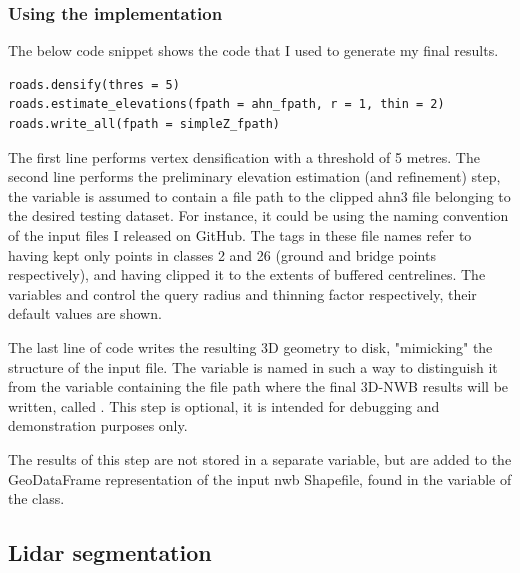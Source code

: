 \subsubsection{Using the implementation}

The below code snippet shows the code that I used to generate my final results.

\begin{verbatim}
roads.densify(thres = 5)
roads.estimate_elevations(fpath = ahn_fpath, r = 1, thin = 2)
roads.write_all(fpath = simpleZ_fpath)
\end{verbatim}

The first line performs vertex densification with a threshold of 5 metres. The second line performs the preliminary elevation estimation (and refinement) step, the variable  is assumed to contain a file path to the clipped \ac{ahn3} file belonging to the desired testing dataset. For instance, it could be  using the naming convention of the input files I released on GitHub. The tags  in these file names refer to having kept only points in classes 2 and 26 (ground and bridge points respectively), and having clipped it to the extents of buffered centrelines. The variables  and  control the query radius and thinning factor respectively, their default values are shown.

The last line of code writes the resulting 3D geometry to disk, "mimicking" the structure of the input file. The variable is named in such a way to distinguish it from the variable containing the file path where the final 3D-NWB results will be written, called . This step is optional, it is intended for debugging and demonstration purposes only.

The results of this step are not stored in a separate variable, but are added to the GeoDataFrame representation of the input \ac{nwb} Shapefile, found in the  variable of the  class.

\subsection{Lidar segmentation}
\label{sub:r_lidarsegmentation}

